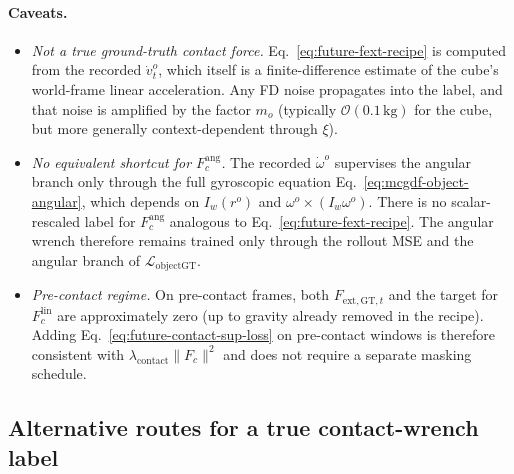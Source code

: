 \documentclass[11pt]{article}
\begin{document}
\paragraph{Caveats.}
\begin{itemize}
  \item \emph{Not a true ground-truth contact force.} Eq.~\eqref{eq:future-fext-recipe}
    is computed from the recorded $\dot v^o_t$, which itself is a
    finite-difference estimate of the cube's world-frame linear
    acceleration. Any FD noise propagates into the label, and that noise
    is amplified by the factor $m_o$ (typically $\mathcal{O}(0.1\,\mathrm{kg})$
    for the cube, but more generally context-dependent through $\xi$).
  \item \emph{No equivalent shortcut for $F_c^{\mathrm{ang}}$.}
    The recorded $\dot\omega^o$ supervises the angular branch only through
    the full gyroscopic equation
    Eq.~\eqref{eq:mcgdf-object-angular}, which depends on $I_w(r^o)$ and
    $\omega^o\!\times\!(I_w\omega^o)$. There is no scalar-rescaled
    label for $F_c^{\mathrm{ang}}$ analogous to
    Eq.~\eqref{eq:future-fext-recipe}. The angular wrench therefore
    remains trained only through the rollout MSE and the angular branch
    of $\mathcal{L}_{\mathrm{objectGT}}$.
  \item \emph{Pre-contact regime.} On pre-contact frames, both
    $F_{\mathrm{ext,GT},t}$ and the target for $F_c^{\mathrm{lin}}$ are
    approximately zero (up to gravity already removed in the recipe).
    Adding Eq.~\eqref{eq:future-contact-sup-loss} on pre-contact windows
    is therefore consistent with $\lambda_{\mathrm{contact}}\|F_c\|^2$
    and does not require a separate masking schedule.
\end{itemize}

\subsection{Alternative routes for a true contact-wrench label}
\end{document}
